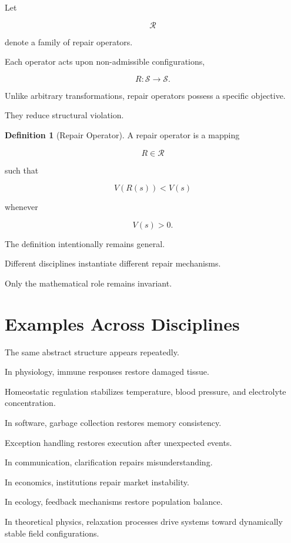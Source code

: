 \documentclass[11pt,oneside]{book}
\numberwithin{equation}{chapter}
\theoremstyle{definition}
\newtheorem{definition}{Definition}[chapter]
\theoremstyle{plain}
\newcommand{\State}{\mathcal{S}}
\newcommand{\Repair}{\mathcal{R}}
\begin{document}
Let

\[
\Repair
\]

denote a family of repair operators.

Each operator acts upon non-admissible configurations,

\[
R :
\State
\rightarrow
\State.
\]

Unlike arbitrary transformations, repair operators possess a specific
objective.

They reduce structural violation.

\begin{definition}[Repair Operator]

A repair operator is a mapping

\[
R \in \Repair
\]

such that

\[
V(R(s))
<
V(s)
\]

whenever

\[
V(s) > 0.
\]

\end{definition}

The definition intentionally remains general.

Different disciplines instantiate different repair mechanisms.

Only the mathematical role remains invariant.

\section{Examples Across Disciplines}

The same abstract structure appears repeatedly.

In physiology, immune responses restore damaged tissue.

Homeostatic regulation stabilizes temperature, blood pressure, and
electrolyte concentration.

In software, garbage collection restores memory consistency.

Exception handling restores execution after unexpected events.

In communication, clarification repairs misunderstanding.

In economics, institutions repair market instability.

In ecology, feedback mechanisms restore population balance.

In theoretical physics, relaxation processes drive systems toward
dynamically stable field configurations.
\end{document}
